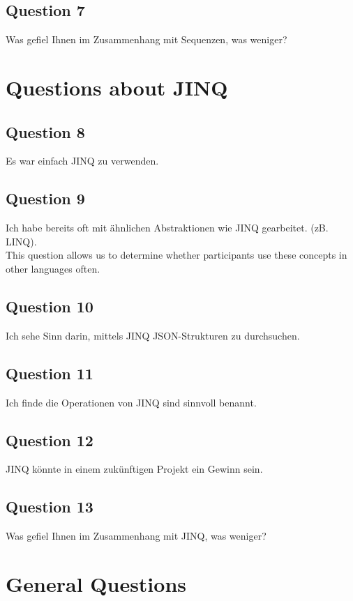 \subsection*{Question 7}
Was gefiel Ihnen im Zusammenhang mit Sequenzen, was weniger?
\label{sub:ut_q7}
\section{Questions about JINQ} %
\label{sec:Questions about JINQ}

\subsection*{Question 8}
\label{sub:ut_q8}
Es war einfach JINQ zu verwenden.
\subsection*{Question 9}
Ich habe bereits oft mit ähnlichen Abstraktionen wie JINQ gearbeitet. (zB.
LINQ).\\
This question allows us to determine whether participants use these concepts in
other languages often.
\label{sub:ut_q9}
\subsection*{Question 10}
\label{sub:ut_q10}
Ich sehe Sinn darin, mittels JINQ JSON-Strukturen zu durchsuchen. 
\subsection*{Question 11}
\label{sub:ut_q11}
Ich finde die Operationen von JINQ sind sinnvoll benannt.
\subsection*{Question 12}
\label{sub:ut_q12}
JINQ könnte in einem zukünftigen Projekt ein Gewinn sein.
\subsection*{Question 13}
\label{sub:ut_q13}
Was gefiel Ihnen im Zusammenhang mit JINQ, was weniger?

\section{General Questions} %
\label{sec:General Questions}

